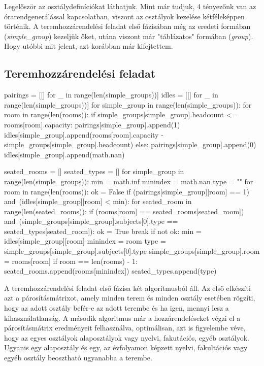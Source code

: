 \documentclass[12pt,a4paper]{report}
\begin{document}
Legelőször az osztálydefiníciókat láthatjuk. Mint már tudjuk, 4 tényezőnk van az órarendgenerálással kapcsolatban, viszont az osztályok kezelése kétféleképpen történik. A teremhozzárendelési feladat első fázisában még az eredeti formában (\textit{simple\_group}) kezeljük őket, utána viszont már "táblázatos" formában (\textit{group}). Hogy utóbbi mit jelent, azt korábban már kifejtettem.

\subsection{Teremhozzárendelési feladat}

\begin{python}
pairings = [[] for _ in range(len(simple_groups))]
idles = [[] for _ in range(len(simple_groups))]
for simple_group in range(len(simple_groups)):
    for room in range(len(rooms)):
        if simple_groups[simple_group].headcount <= rooms[room].capacity:
            pairings[simple_group].append(1)
            idles[simple_group].append(rooms[room].capacity -
            simple_groups[simple_group].headcount)
        else:
            pairings[simple_group].append(0)
            idles[simple_group].append(math.nan)

seated_rooms = []
seated_types = []
for simple_group in range(len(simple_groups)):
    min = math.inf
    minindex = math.nan
    type = ""
    for room in range(len(rooms)):
        ok = False
        if (pairings[simple_group][room] == 1) and\
           (idles[simple_group][room] < min):
            for seated_room in range(len(seated_rooms)):
                if (rooms[room] == seated_rooms[seated_room]) and\
                   (simple_groups[simple_group].subjects[0].type ==
                    seated_types[seated_room]):
                    ok = True
                    break
            if not ok:
                min = idles[simple_group][room]
                minindex = room
                type = simple_groups[simple_group].subjects[0].type
                simple_groups[simple_group].room = rooms[room]
        if room == len(rooms) - 1:
            seated_rooms.append(rooms[minindex])
            seated_types.append(type)
\end{python}

A teremhozzárendelési feladat első fázisa két algoritmusból áll. Az első elkészíti azt a párosításmátrixot, amely minden terem és minden osztály esetében rögzíti, hogy az adott osztály befér-e az adott terembe és ha igen, mennyi lesz a kihasználatlanság. A második algoritmus már a hozzárendeléseket végzi el a párosításmátrix eredményeit felhasználva, optimálisan, azt is figyelembe véve, hogy az egyes osztályok alaposztályok vagy nyelvi, fakutációs, egyéb osztályok. Ugyanis egy alaposztály és egy, az évfolyamon képzett nyelvi, fakultációs vagy egyéb osztály beosztható ugyanabba a terembe.
\end{document}
